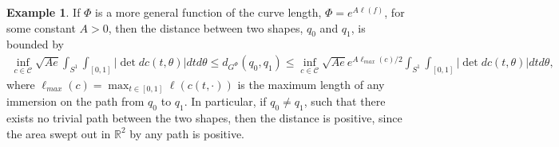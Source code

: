 \documentclass[a4,danish]{article}
\theoremstyle{break}
\theoremstyle{definition}
\theoremstyle{Break}
\newtheorem{example}[subsection]{Example}
\newcommand{\R}{\mathbb{R}}
\begin{document}
\begin{example}
If $\Phi$ is a more general function of the curve length, $\Phi = e^{A \ell (f)}$, for some constant $A > 0$, then the distance between two shapes, $q_0$ and $q_1$, is bounded by
\begin{align*}
\inf_{c\in\mathcal{C}} \sqrt{A e} \int_{S^1} \int_{[0,1]} \left| \det dc(t, \theta) \right| dt d\theta \leq d_{G^\Phi}(q_0, q_1) \leq \inf_{c\in\mathcal{C}} \sqrt{A e} e^{A \ell_{max}(c) / 2} \int_{S^1} \int_{[0,1]} \left| \det dc(t, \theta) \right| dt d\theta,
\end{align*}
where $\ell_{max} (c) = \max_{t \in [0,1]} \ell (c(t, \cdot))$ is the maximum length of any immersion on the path from $q_0$ to $q_1$. In particular, if $q_0 \neq q_1$, such that there exists no trivial path between the two shapes, then the distance is positive, since the area swept out in $\R^2$ by any path is positive. 
\end{example}
\end{document}
